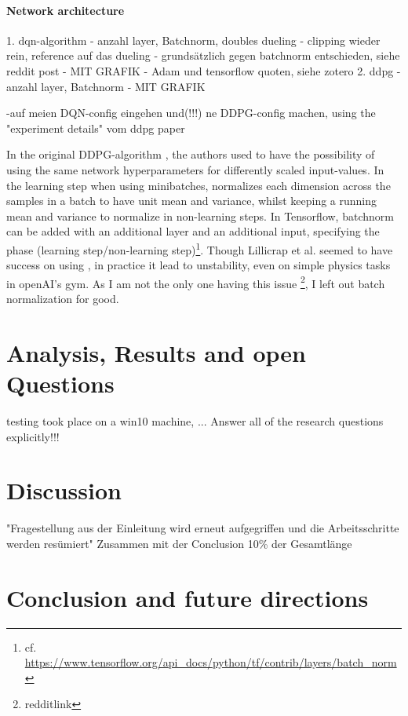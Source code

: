 \subsubsection{Network architecture}

1. dqn-algorithm
  - anzahl layer, Batchnorm, doubles dueling
  - clipping wieder rein, reference auf das dueling
  - grundsätzlich gegen batchnorm entschieden, siehe reddit post
  - MIT GRAFIK
  - Adam und tensorflow quoten, siehe zotero
2. ddpg
  - anzahl layer, Batchnorm
  - MIT GRAFIK
  
-auf meien DQN-config eingehen und(!!!) ne DDPG-config machen, using the "experiment details" vom ddpg paper  
  
  
In the original DDPG-algorithm \cite{lillicrap_continuous_2015}, the authors used  \cite{ioffe_batch_2015} to have the possibility of using the same network hyperparameters for differently scaled input-values. In the learning step when using minibatches, \batchnorm normalizes each dimension across the samples in a batch to have unit mean and variance, whilst keeping a running mean and variance to normalize in non-learning steps. In Tensorflow, batchnorm can be added with an additional layer and an additional input, specifying the phase (learning step/non-learning step)\footnote{cf. \url{https://www.tensorflow.org/api\_docs/python/tf/contrib/layers/batch_norm}}. Though Lillicrap et al. seemed to have success on using \batchnorm, in practice it lead to unstability, even on simple physics tasks in openAI's gym. As I am not the only one having this issue \footnote{redditlink}, I left out batch normalization for good.

\chapter{Analysis, Results and open Questions}

testing took place on a win10 machine, ...
Answer all of the research questions explicitly!!!

\chapter{Discussion}

"Fragestellung aus der Einleitung wird erneut aufgegriffen und die Arbeitsschritte
werden resümiert"
Zusammen mit der Conclusion 10\% der Gesamtlänge

\chapter{Conclusion and future directions}


